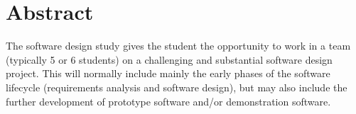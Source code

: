 \documentclass{article}
\begin{document}
    \section{Abstract}
	The software design study gives the student the opportunity to work in a team (typically 5 or 6 students) on a challenging and substantial software design project. This will normally include mainly the early phases of the software lifecycle (requirements analysis and software design), but may also include the further development of prototype software and/or demonstration software.\\
\end{document}
